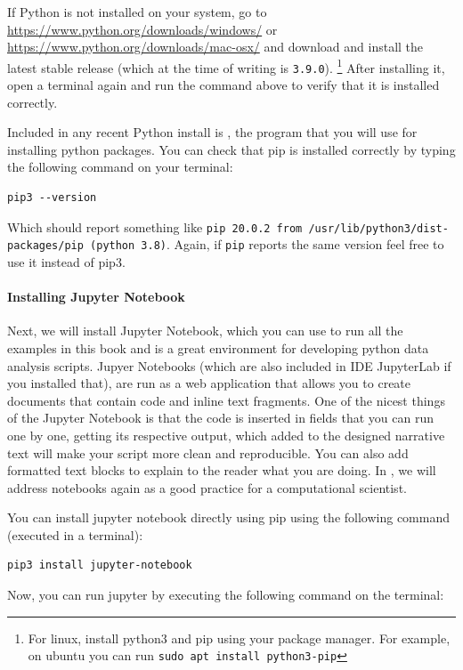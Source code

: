 If Python is not installed on your system, go to \url{https://www.python.org/downloads/windows/} or \url{https://www.python.org/downloads/mac-osx/} and download and install the latest stable release (which at the time of writing is \verb|3.9.0|).
\footnote{For linux, install python3 and pip using your package manager. For example, on ubuntu you can run \texttt{sudo apt install python3-pip}}
After installing it, open a terminal again and run the command above to verify that it is installed correctly.

Included in any recent Python install is , the program that you will use for installing python packages.
You can check that pip is installed correctly by typing the following command on your terminal:

\begin{verbatim}
pip3 --version
\end{verbatim}

Which should report something like \texttt{pip 20.0.2 from /usr/lib/python3/dist-packages/pip (python 3.8)}.
Again, if \verb|pip| reports the same version feel free to use it instead of pip3. 

\paragraph{Installing Jupyter Notebook}
Next, we will install Jupyter Notebook, which you can use to run all the examples in this book
and is a great environment for developing python data analysis scripts.
Jupyer Notebooks (which are also included in IDE JupyterLab if you installed that), 
are run as a web application
that allows you to create documents that contain code and inline text fragments.
 One of the nicest things of
the Jupyter Notebook is that the code is inserted in fields that you
can run one by one, getting its respective output, which added to the
designed narrative text will make your script more clean and
reproducible. You can also add formatted text blocks to explain to the
reader what you are doing. In , we will address
notebooks again as a good practice for a computational scientist.

You can install jupyter notebook directly using pip using the following command
(executed in a terminal):

\begin{verbatim}
pip3 install jupyter-notebook
\end{verbatim}

Now, you can run jupyter by executing the following command on the terminal:


